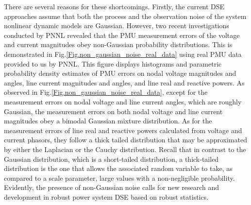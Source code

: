 \documentclass[10pt]{IEEEtran}
\begin{document}
There are several reasons for these shortcomings. Firstly, the current DSE approaches assume that both the process and the observation noise of the system nonlinear dynamic models are Gaussian. However, two recent investigations conducted by PNNL \cite{henry2015_PNNL,PNNL_report2014} revealed that the PMU measurement errors of the voltage and current magnitudes obey non-Gaussian probability distributions. This is demonstrated in Fig.\ref{Fig.non_gaussian_noise_real_data} using real PMU data provided to us by PNNL. This figure displays histograms and parametric probability density estimates of PMU errors on nodal voltage magnitudes and angles, line current magnitudes and angles, and line real and reactive powers. As observed in Fig.\ref{Fig.non_gaussian_noise_real_data}, except for the measurement errors on nodal voltage and line current angles, which are roughly Gaussian, the measurement errors on both nodal voltage and line current magnitudes obey a bimodal Gaussian mixture distribution. As for the measurement errors of line real and reactive powers calculated from voltage and current phasors, they follow a thick tailed distribution that may be approximated by either the Laplacian or the Cauchy distribution. Recall that in contrast to the Gaussian distribution, which is a short-tailed distribution, a thick-tailed distribution is the one that allows the associated random variable to take, as compared to a scale parameter, large values with a non-negligible probability. Evidently, the presence of non-Gaussian noise calls for new research and development in robust power system DSE based on robust statistics.
\end{document}
